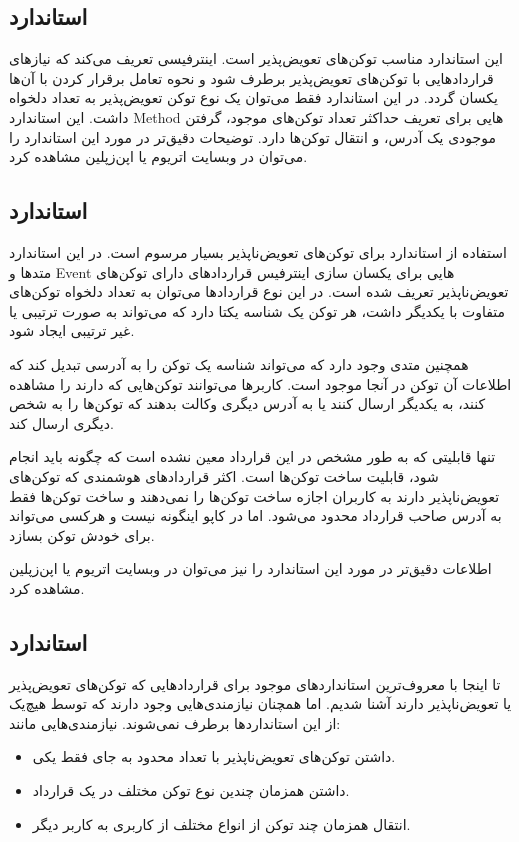 \subsection{استاندارد }
این استاندارد مناسب توکن‌های تعویض‌پذیر است.
اینترفیسی تعریف می‌کند که نیازهای قراردادهایی با توکن‌های تعویض‌پذیر برطرف شود
و نحوه تعامل برقرار کردن با آن‌ها یکسان گردد.
در این استاندارد فقط می‌توان یک نوع توکن تعویض‌پذیر به تعداد دلخواه داشت.
این استاندارد
\gls{Method}
هایی برای تعریف حداکثر تعداد توکن‌های موجود،
گرفتن موجودی یک آدرس، و انتقال توکن‌ها دارد. توضیحات دقیق‌تر در مورد این استاندارد را می‌توان در وبسایت
اتریوم
یا اپن‌زپلین
مشاهده کرد.

\subsection{استاندارد }
استفاده از استاندارد
برای توکن‌های تعویض‌ناپذیر بسیار مرسوم است.
در این استاندارد متدها و
\gls{Event}
هایی برای یکسان سازی اینترفیس قراردادهای دارای توکن‌های تعویض‌ناپذیر تعریف شده است.
در این نوع قرارداد‌ها می‌توان به تعداد دلخواه توکن‌های متفاوت با یکدیگر داشت،
هر توکن یک شناسه یکتا دارد که می‌تواند به صورت ترتیبی یا غیر ترتیبی ایجاد شود.

همچنین متدی وجود دارد که می‌تواند شناسه یک توکن را به آدرسی تبدیل کند که اطلاعات آن توکن در آنجا موجود است.
کاربرها می‌توانند توکن‌هایی که دارند را مشاهده کنند،
به یکدیگر ارسال کنند یا به آدرس دیگری وکالت بدهند که توکن‌ها را به شخص دیگری ارسال کند.

تنها قابلیتی که به طور مشخص در این قرارداد معین نشده است که چگونه باید انجام شود،
قابلیت ساخت توکن‌ها است.
اکثر قراردادهای هوشمندی که توکن‌های تعویض‌ناپذیر دارند به کاربران اجازه ساخت توکن‌ها را نمی‌دهند
و ساخت توکن‌ها فقط به آدرس صاحب قرارداد محدود می‌شود.
اما در کاپو اینگونه نیست و هرکسی می‌تواند برای خودش توکن بسازد.

اطلاعات دقیق‌تر در مورد این استاندارد را نیز می‌توان در وبسایت
اتریوم
یا
اپن‌زپلین
مشاهده کرد.


\subsection{استاندارد }
تا اینجا با معروف‌ترین استاندارد‌های موجود برای قراردادهایی که توکن‌های تعویض‌پذیر یا تعویض‌ناپذیر دارند آشنا شدیم.
اما همچنان نیازمندی‌هایی وجود دارند که توسط هیچ‌یک از این استانداردها برطرف نمی‌شوند. نیازمندی‌هایی مانند:
\begin{itemize}
	\item
داشتن توکن‌های تعویض‌ناپذیر با تعداد محدود به جای فقط یکی.
	\item
داشتن همزمان چندین نوع توکن مختلف در یک قرارداد.
	\item
انتقال همزمان چند توکن از انواع مختلف از کاربری به کاربر دیگر.
\end{itemize}

